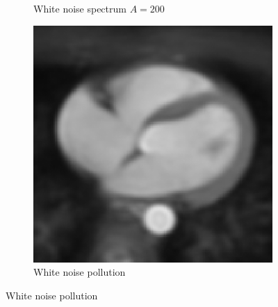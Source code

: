 \documentclass[UTF8]{ctexart}
\begin{document}
\begin{figure}[htbp]
\begin{subfigure}{0.3\textwidth}
        \caption{White noise spectrum $A=200$}
    \end{subfigure}%
    \hfill
    \begin{subfigure}{0.3\textwidth}
        \centering
        \includegraphics[width=\linewidth]{heart_noised_white.png}
        \caption{White noise pollution}
    \end{subfigure}


\end{figure}
\end{document}
